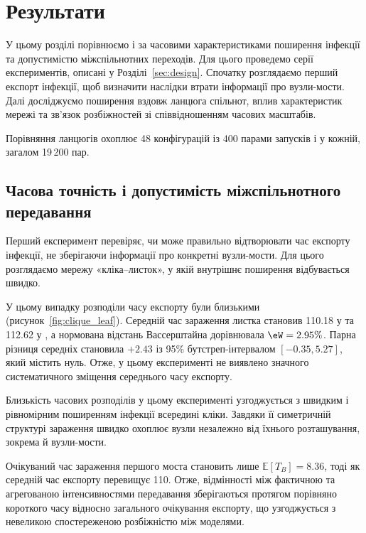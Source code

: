 \section{Результати}
\label{sec:results}

У цьому розділі порівнюємо \Full{} і \TS{}
за часовими характеристиками поширення інфекції
та допустимістю міжспільнотних переходів.
Для цього проведемо серії експериментів, описані у Розділі~\ref{sec:design}.
Спочатку розглядаємо перший експорт інфекції,
щоб визначити наслідки втрати інформації
про вузли-мости. Далі досліджуємо поширення
вздовж ланцюга спільнот, вплив характеристик
мережі та зв'язок розбіжностей зі співвідношенням
часових масштабів.

Порівняння ланцюгів охоплює 48 конфігурацій
із 400 парами запусків \Full{} і \TS{} у кожній,
загалом 19\,200 пар.


\subsection{Часова точність і допустимість
міжспільнотного передавання}
\label{sec:res_clique}

Перший експеримент перевіряє, чи може \TS{}
правильно відтворювати час експорту інфекції,
не зберігаючи інформації про конкретні
вузли-мости. Для цього розглядаємо мережу
«кліка--листок», у якій внутрішнє поширення
відбувається швидко.

У цьому випадку розподіли часу експорту
були близькими (рисунок~\ref{fig:clique_leaf}).
Середній час зараження листка становив
110.18 у \Full{} та 112.62 у \TS{},
а нормована відстань Вассерштайна
дорівнювала $\eW=2.95\%$.
Парна різниця середніх становила $+2.43$
із 95\% бутстреп-інтервалом $[-0.35,5.27]$,
який містить нуль. Отже, у цьому експерименті
не виявлено значного систематичного
зміщення середнього часу експорту.

Близькість часових розподілів у цьому
експерименті узгоджується з швидким
і рівномірним поширенням інфекції
всередині кліки. Завдяки її симетричній
структурі зараження швидко охоплює
вузли незалежно від їхнього розташування,
зокрема й вузли-мости.

Очікуваний час зараження першого моста
становить лише $\mathbb{E}[T_B]=8.36$,
тоді як середній час експорту перевищує 110.
Отже, відмінності між фактичною
та агрегованою інтенсивностями передавання
зберігаються протягом порівняно короткого
часу відносно загального очікування експорту,
що узгоджується з невеликою спостереженою
розбіжністю між моделями.

